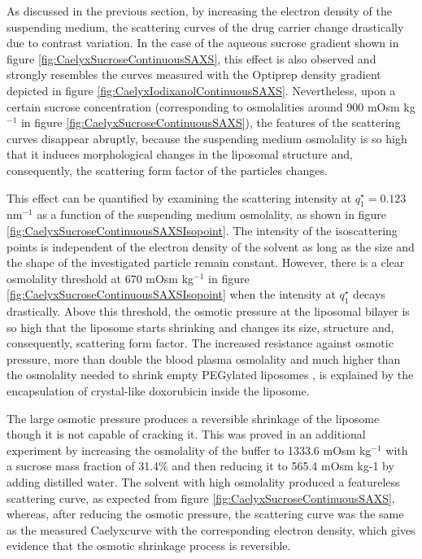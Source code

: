 As discussed in the previous section, by increasing the electron density of the suspending medium, the scattering curves of the drug carrier change drastically due to contrast variation. In the case of the aqueous sucrose gradient shown in figure \ref{fig:CaelyxSucroseContinuousSAXS}, this effect is also observed and strongly resembles the curves measured with the Optiprep \textregistered density gradient depicted in figure \ref{fig:CaelyxIodixanolContinuousSAXS}. Nevertheless, upon a certain sucrose concentration (corresponding to osmolalities around 900 mOsm kg$^{-1}$ in figure \ref{fig:CaelyxSucroseContinuousSAXS}), the features of the scattering curves disappear abruptly, because the suspending medium osmolality is so high that it induces morphological changes in the liposomal structure and, consequently, the scattering form factor of the particles changes.

This effect can be quantified by examining the scattering intensity at $q^{\star}_1 = 0.123$ nm$^{-1}$ as a function of the suspending medium osmolality, as shown in figure \ref{fig:CaelyxSucroseContinuousSAXSIsopoint}. The intensity of the isoscattering points is independent of the electron density of the solvent as long as the size and the shape of the investigated particle remain constant. However, there is a clear osmolality threshold at 670 mOsm kg$^{-1}$ in figure \ref{fig:CaelyxSucroseContinuousSAXSIsopoint} when the intensity at $q^{\star}_1$ decays drastically. Above this threshold, the osmotic pressure at the liposomal bilayer is so high that the liposome starts shrinking and changes its size, structure and, consequently, scattering form factor. The increased resistance against osmotic pressure, more than double the blood plasma osmolality and much higher than the osmolality needed to shrink empty PEGylated liposomes \citep{varga_osmotic_2014}, is explained by the encapsulation of crystal-like doxorubicin inside the liposome.

The large osmotic pressure produces a reversible shrinkage of the liposome though it is not capable of cracking it. This was proved in an additional experiment by increasing the osmolality of the buffer to 1333.6 mOsm kg$^{-1}$ with a sucrose mass fraction of 31.4$\%$ and then reducing it to 565.4 mOsm kg-1 by adding distilled water. The solvent with high osmolality produced a featureless scattering curve, as expected from figure \ref{fig:CaelyxSucroseContinuousSAXS}, whereas, after reducing the osmotic pressure, the scattering curve was the same as the measured Caelyx\textregistered curve with the corresponding electron density, which gives evidence that the osmotic shrinkage process is reversible.

